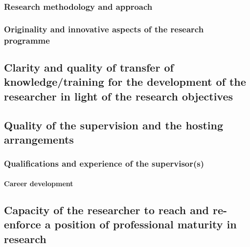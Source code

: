 \subsubsection{Research methodology and approach}

\subsubsection{Originality and innovative aspects of the research programme}

\subsection{Clarity and quality of transfer of knowledge/training for the development of the researcher in light of the research objectives}
\label{sec:transfer}


\subsection{Quality of the supervision and the hosting arrangements}
\label{sec:supervision}

\subsubsection*{Qualifications and experience of the supervisor(s)}


\paragraph{Career development}

\subsection{Capacity of the researcher to reach and re-enforce a position of professional maturity in research}
\label{sec:maturity}

